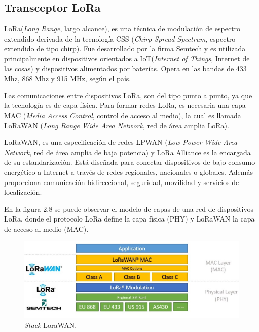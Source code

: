 
\subsection{Transceptor LoRa}

LoRa(\textit{Long Range}, largo alcance), es una técnica de modulación de espectro extendido derivada de la tecnología CSS (\textit{Chirp Spread Spectrum}, espectro extendido de tipo chirp)\citep{WEBSITE:9}. Fue desarrollado por la firma Semtech y es utilizada principalmente en dispositivos orientados a IoT(\textit{Internet of Things}, Internet de las cosas) y dispositivos alimentados por baterías. Opera en las bandas de 433 Mhz, 868 Mhz y 915 MHz, según el país.

Las comunicaciones entre dispositivos LoRa, son del tipo punto a punto, ya que la tecnología es de capa física. Para formar redes LoRa, es necesaria una capa MAC (\textit{Media Access Control}, control de acceso al medio), la cual es llamada LoRaWAN (\textit{Long Range Wide Area Network}, red de área amplia LoRa).

LoRaWAN, es una especificación de redes LPWAN (\textit{Low Power Wide Area Network}, red de área amplia de baja potencia) y LoRa Alliance es la encargada de su estandarización. Está diseñada para conectar dispositivos de bajo consumo energético a Internet a través de redes regionales, nacionales o globales. Además proporciona comunicación bidireccional, seguridad, movilidad y servicios de localización\citep{WEBSITE:10}.

En la figura 2.8 se puede observar el modelo de capas de una red de dispositivos LoRa, donde el protocolo LoRa define la capa física (PHY) y LoRaWAN la capa de acceso al medio (MAC).

\begin{figure}[h]
	\centering
	\includegraphics[scale=0.38]{./Figures/lorawan.jpg}
	\caption{\textit{Stack} LoraWAN\protect\footnotemark.}
	\label{fig:cuadradoAzul}
\end{figure}

